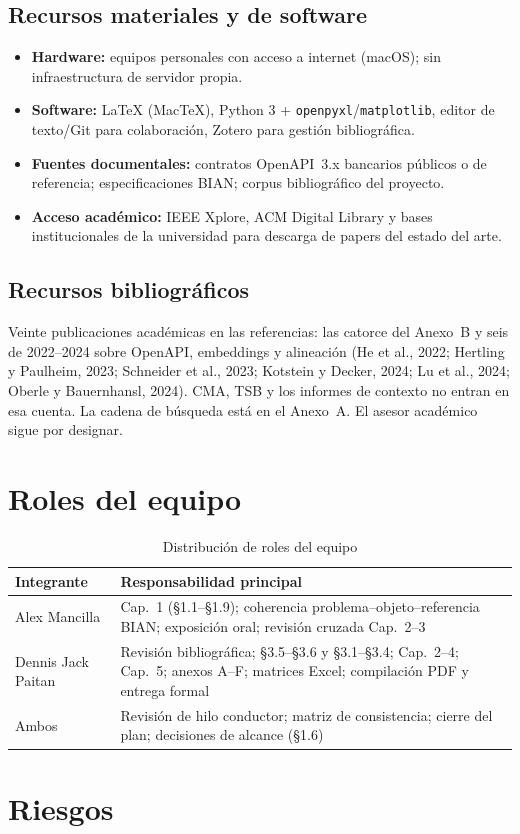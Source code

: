 \subsection{Recursos materiales y de software}

\begin{itemize}
  \item \textbf{Hardware:} equipos personales con acceso a internet (macOS); sin infraestructura
        de servidor propia.
  \item \textbf{Software:} \LaTeX{} (MacTeX), Python 3 + \texttt{openpyxl}/\texttt{matplotlib},
        editor de texto/Git para colaboración, Zotero para gestión bibliográfica.
  \item \textbf{Fuentes documentales:} contratos OpenAPI~3.x bancarios públicos o de referencia;
        especificaciones \ServiceDomain{} BIAN; corpus bibliográfico del proyecto.
  \item \textbf{Acceso académico:} IEEE Xplore, ACM Digital Library y bases institucionales de la
        universidad para descarga de papers del estado del arte.
\end{itemize}

\subsection{Recursos bibliográficos}

Veinte publicaciones académicas en las referencias: las catorce del Anexo~B y seis de
2022--2024 sobre OpenAPI, embeddings y alineación (He et al., 2022; Hertling y Paulheim, 2023;
Schneider et al., 2023; Kotstein y Decker, 2024; Lu et al., 2024; Oberle y Bauernhansl, 2024).
CMA, TSB y los informes de contexto no entran en esa cuenta. La cadena de búsqueda está en el
Anexo~A. El asesor académico sigue por designar.

\section{Roles del equipo}

\begin{table}[H]
  \centering
  \caption{Distribución de roles del equipo}
  \label{tab:roles}
  \small
  \begin{tabular}{@{}p{}p{}@{}}
    \toprule
    \textbf{Integrante} & \textbf{Responsabilidad principal} \\
    \midrule
    Alex Mancilla &
    Cap.~1 (§1.1--§1.9); coherencia problema--objeto--referencia BIAN; exposición oral;
    revisión cruzada Cap.~2--3 \\
    Dennis Jack Paitan &
    Revisión bibliográfica; §3.5--§3.6 y §3.1--§3.4; Cap.~2--4; Cap.~5; anexos A--F; matrices Excel;
    compilación PDF y entrega formal \\
    Ambos &
    Revisión de hilo conductor; matriz de consistencia; cierre del plan; decisiones de alcance
    (§1.6) \\
    \bottomrule
  \end{tabular}
\end{table}

\section{Riesgos}


